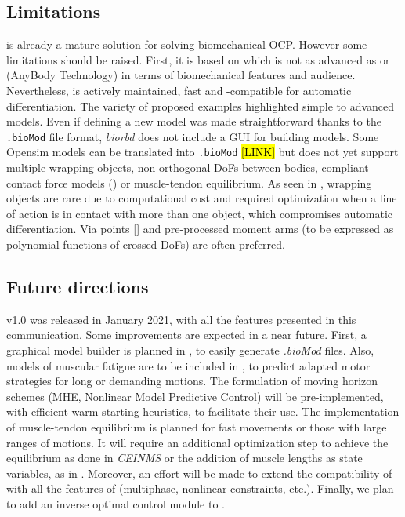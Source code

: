 \subsection{Limitations}

\bioptim is already a mature solution for solving biomechanical OCP. 
However some limitations should be raised. 
First, it is based on  \biorbd which is not as advanced as \opensim or \anybody (AnyBody Technology) in terms of biomechanical features and audience.
Nevertheless,  \biorbd is actively maintained, fast and \casadi-compatible for automatic differentiation.
The variety of proposed examples highlighted simple to advanced models.
Even if defining a new model was made straightforward thanks to the \texttt{.bioMod} file format, \textit{biorbd} does not include a GUI for building models. 
Some Opensim models can be translated into \texttt{.bioMod} \hl{[LINK]} but \biorbd does not yet support multiple wrapping objects, non-orthogonal DoFs between bodies, compliant contact force models (\cite{serrancoli2019subject}) or muscle-tendon equilibrium. 
As seen in \cite{dembia2020opensim}, wrapping objects are rare due to computational cost and required optimization when a line of action is in contact with more than one object, which compromises automatic differentiation. 
Via points [\addref] and pre-processed moment arms \cite{van2011implicit} (to be expressed as polynomial functions of crossed DoFs) are often preferred. 

\subsection{Future directions}

\bioptim v1.0 was released in January 2021, with all the features presented in this communication.
Some improvements are expected in a near future.
First, a graphical model builder is planned in \biorbd, to easily generate \textit{.bioMod} files.
Also, models of muscular fatigue are to be included in \bioptim, to predict adapted motor strategies for long or demanding motions.
The formulation of moving horizon schemes (MHE, Nonlinear Model Predictive Control) will be pre-implemented, with efficient warm-starting heuristics, to facilitate their use.
The implementation of muscle-tendon equilibrium is planned for fast movements or those with large ranges of motions. 
It will require an additional optimization step to achieve the equilibrium as done in \textit{CEINMS} \cite{pizzolato2015ceinms} or the addition of muscle lengths as state variables, as in \cite{van2011implicit}.  
Moreover, an effort will be made to extend the compatibility of \acados with all the features of \bioptim (multiphase, nonlinear constraints, etc.). 
Finally, we plan to add an inverse optimal control module to \bioptim.
